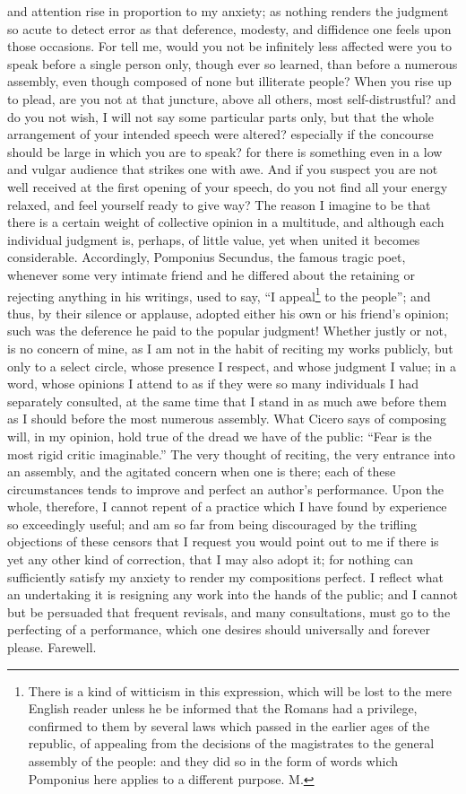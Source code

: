 and attention rise in proportion to my anxiety; as nothing renders the
judgment so acute to detect error as that deference, modesty, and
diffidence one feels upon those occasions. For tell me, would you not be
infinitely less affected were you to speak before a single person only,
though ever so learned, than before a numerous assembly, even though
composed of none but illiterate people? When you rise up to plead, are you
not at that juncture, above all others, most self-distrustful? and do you
not wish, I will not say some particular parts only, but that the whole
arrangement of your intended speech were altered? especially if the
concourse should be large in which you are to speak? for there is
something even in a low and vulgar audience that strikes one with awe. And
if you suspect you are not well received at the first opening of your
speech, do you not find all your energy relaxed, and feel yourself ready
to give way? The reason I imagine to be that there is a certain weight of
collective opinion in a multitude, and although each individual judgment
is, perhaps, of little value, yet when united it becomes considerable.
Accordingly, Pomponius Secundus, the famous tragic poet, whenever some
very intimate friend and he differed about the retaining or rejecting
anything in his writings, used to say, ``I appeal\footnote{There is a kind of
witticism in this expression, which will be lost to the mere English
reader unless he be informed that the Romans had a privilege, confirmed to
them by several laws which passed in the earlier ages of the republic, of
appealing from the decisions of the magistrates to the general assembly of
the people: and they did so in the form of words which Pomponius here
applies to a different purpose. M.} to the people''; and
thus, by their silence or applause, adopted either his own or his friend's
opinion; such was the deference he paid to the popular judgment! Whether
justly or not, is no concern of mine, as I am not in the habit of reciting
my works publicly, but only to a select circle, whose presence I respect,
and whose judgment I value; in a word, whose opinions I attend to as if
they were so many individuals I had separately consulted, at the same time
that I stand in as much awe before them as I should before the most
numerous assembly. What Cicero says of composing will, in my opinion, hold
true of the dread we have of the public: ``Fear is the most rigid critic
imaginable.'' The very thought of reciting, the very entrance into an
assembly, and the agitated concern when one is there; each of these
circumstances tends to improve and perfect an author's performance. Upon
the whole, therefore, I cannot repent of a practice which I have found by
experience so exceedingly useful; and am so far from being discouraged by
the trifling objections of these censors that I request you would point
out to me if there is yet any other kind of correction, that I may also
adopt it; for nothing can sufficiently satisfy my anxiety to render my
compositions perfect. I reflect what an undertaking it is resigning any
work into the hands of the public; and I cannot but be persuaded that
frequent revisals, and many consultations, must go to the perfecting of a
performance, which one desires should universally and forever please.
Farewell.

